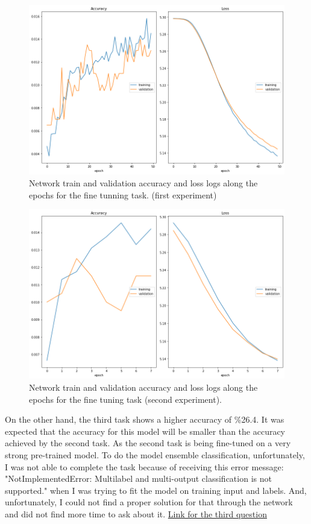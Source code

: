 \documentclass[12pt,oneside,geqno]{article}
\begin{document}
	
	\begin{figure}
		\centering
		\includegraphics[width=\textwidth]{../figs/q2_acc.png}
		\caption{Network train and validation accuracy and loss logs along the epochs for the fine tunning task. (first experiment)}
		\label{img:q2_acc}
	\end{figure}
	\begin{figure}
		\centering
		\includegraphics[width=\textwidth]{../figs/q2_acc_6.png}
		\caption{Network train and validation accuracy and loss logs along the epochs for the fine tuning task (second experiment).}
		\label{img:q2_acc_6}
	\end{figure}
	
	On the other hand, the third task shows a higher accuracy of \%26.4. It was expected that the accuracy for this model will be smaller than the accuracy achieved by the second task. As the second task is being fine-tuned on a very strong pre-trained model. To do the model ensemble classification, unfortunately, I was not able to complete the task because of receiving this error message: "NotImplementedError: Multilabel and multi-output classification is not supported." when I was trying to fit the model on training input and labels. And, unfortunately, I could not find a proper solution for that through the network and did not find more time to ask about it.
	\href{https://colab.research.google.com/drive/1LOb1nhmdRy_zXkRVinynlgsTIWOysq0U?authuser=1#scrollTo=7J7lbaO3QTNK\&line=1\&uniqifier=1}{Link for the third question}
	
\end{document}
